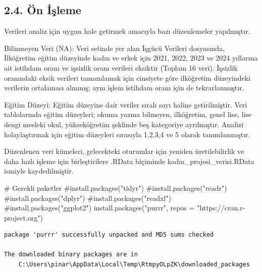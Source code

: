 \documentclass[
  11pt,
  a4paper,
  DIV=11,
  numbers=noendperiod]{scrartcl}
\newenvironment{Shaded}{\begin{snugshade}}{\end{snugshade}}
\newcommand{\AttributeTok}[1]{\textcolor[rgb]{0.40,0.45,0.13}{#1}}
\newcommand{\CommentTok}[1]{\textcolor[rgb]{0.37,0.37,0.37}{#1}}
\newcommand{\FunctionTok}[1]{\textcolor[rgb]{0.28,0.35,0.67}{#1}}
\newcommand{\NormalTok}[1]{\textcolor[rgb]{0.00,0.23,0.31}{#1}}
\newcommand{\StringTok}[1]{\textcolor[rgb]{0.13,0.47,0.30}{#1}}
\begin{document}
\subsection{2.4. Ön İşleme}\label{uxf6n-iux15fleme}

Verileri analiz için uygun hale getirmek amacıyla bazı düzenlemeler
yapılmıştır.

Bilinmeyen Veri (NA): Veri setinde yer alan İşgücü Verileri dosyasında,
İlköğretim eğitim düzeyinde kadın ve erkek için 2021, 2022, 2023 ve 2024
yıllarına ait istihdam oranı ve işsizlik oranı verileri eksiktir (Toplam
16 veri). İşsizlik oranındaki eksik verileri tamamlamak için cinsiyete
göre ilköğretim düzeyindeki verilerin ortalaması alınmış; aynı işlem
istihdam oranı için de tekrarlanmıştır.

Eğitim Düzeyi: Eğitim düzeyine dair veriler sıralı sayı haline
getirilmiştir. Veri tablolarında eğitim düzeyleri; okuma yazma bilmeyen,
ilköğretim, genel lise, lise dengi mesleki okul, yükseköğretim şeklinde
beş kategoriye ayrılmıştır. Analizi kolaylaştırmak için eğitim düzeyleri
sırasıyla 1,2,3,4 ve 5 olarak tanımlanmıştır.

Düzenlenen veri kümeleri, gelecekteki oturumlar için yeniden
üretilebilirlik ve daha hızlı işleme için birleştirilere .RData
biçiminde kadın\_projesi\_verisi.RData ismiyle kaydedilmiştir.

\begin{Shaded}
\begin{Highlighting}[]
\CommentTok{\# Gerekli paketler}
\CommentTok{\#install.packages("tidyr")}
\CommentTok{\#install.packages("readr")}
\CommentTok{\#install.packages("dplyr")}
\CommentTok{\#install.packages("readxl")}
\CommentTok{\#install.packages("ggplot2")}
\FunctionTok{install.packages}\NormalTok{(}\StringTok{"purrr"}\NormalTok{, }\AttributeTok{repos =} \StringTok{"https://cran.r{-}project.org"}\NormalTok{)}
\end{Highlighting}
\end{Shaded}

\begin{verbatim}
package 'purrr' successfully unpacked and MD5 sums checked

The downloaded binary packages are in
    C:\Users\pinar\AppData\Local\Temp\RtmpyOLpZK\downloaded_packages
\end{verbatim}
\end{document}
